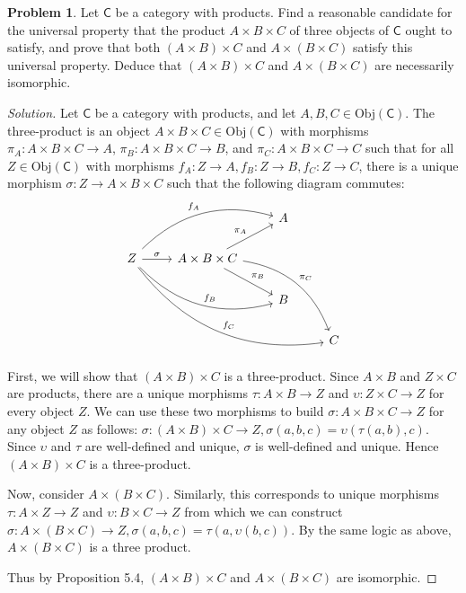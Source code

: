 \documentclass[fontsize=14pt]{scrartcl}
\theoremstyle{definition}
\newtheorem{problem-internal}{Problem}[subsection]
\newenvironment{problem}{
  \medskip
  \begin{problem-internal}
}{
  \end{problem-internal}
}
\newenvironment{solution}{
  \begin{proof}[Solution]
  \vspace{-8px}
  \setlength{\parskip}{4px}
  \setlength{\parindent}{0px}
}{
  \end{proof}
}
\newcommand{\Obj}{\mathrm{Obj}}
\begin{document}
\begin{problem}
\def \C {\mathsf{C}}
Let $\C$ be a category with products. Find a reasonable candidate for the
universal property that the product $A\times B\times C$ of three objects of $\C$
ought to satisfy, and prove that both $(A\times B)\times C$ and $A\times
(B\times C)$ satisfy this universal property. Deduce that $(A\times B)\times C$
and $A\times (B\times C)$ are necessarily isomorphic.
\end{problem}
\begin{solution}
\def \C {\mathsf{C}}
\def \tp {A\times B\times C}
Let $\C$ be a category with products, and let $A,B,C\in\Obj(\C)$. The
three-product is an object $\tp\in\Obj(\C)$ with morphisms $\pi_A:\tp\to A$,
$\pi_B:\tp\to B$, and $\pi_C:\tp\to C$ such that for all $Z\in\Obj(\C)$ with
morphisms $f_A:Z\to A,f_B:Z\to B,f_C:Z\to C$, there is a unique morphism
$\sigma:Z\to\tp$ such that the following diagram commutes:
\[\begin{tikzcd}
&&A \\
Z\arrow[r,"\sigma"]\arrow[urr,bend left,"f_A"]\arrow[drr,bend right,"f_B"]\arrow[ddrrr,bend right,"f_C"]&
      \tp\arrow[ur,"\pi_A"]\arrow[dr,"\pi_B"]\arrow[ddrr,bend left,"\pi_C"] \\
&&B \\
&&&C
\end{tikzcd}\]

First, we will show that $(A\times B)\times C$ is a three-product. Since
$A\times B$ and $Z\times C$ are products, there are a unique morphisms
$\tau:A\times B\to Z$ and $\upsilon:Z\times C\to Z$ for every object $Z$.  We
can use these two morphisms to build $\sigma:\tp\to Z$ for any object $Z$ as
follows: $\sigma:(A\times B)\times C\to Z, \sigma(a,b,c)=\upsilon(\tau(a,b),c)$.
Since $\upsilon$ and $\tau$ are well-defined and unique, $\sigma$ is
well-defined and unique. Hence $(A\times B)\times C$ is a three-product.

Now, consider $A\times(B\times C)$. Similarly, this corresponds to unique
morphisms $\tau:A\times Z\to Z$ and $\upsilon:B\times C\to Z$ from which we can
construct $\sigma:A\times(B\times C)\to Z,\sigma(a,b,c)=\tau(a,\upsilon(b,c))$.
By the same logic as above, $A\times(B\times C)$ is a three product.

Thus by Proposition 5.4, $(A\times B)\times C$ and $A\times(B\times C)$ are
isomorphic.
\end{solution}
\end{document}
